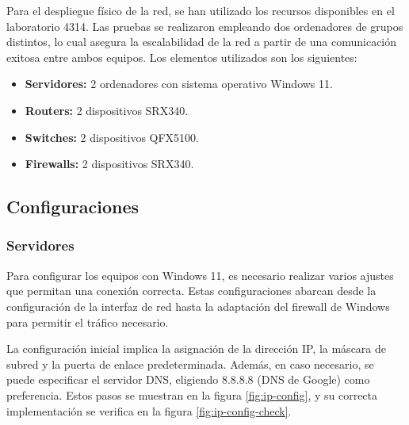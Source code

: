 \documentclass[%
    school=etsisi,%
    degree=61TI,%
]{upm-report}
\begin{document}
Para el despliegue físico de la red, se han utilizado los recursos disponibles en el laboratorio 4314. Las pruebas se realizaron empleando dos ordenadores de grupos distintos, lo cual asegura la escalabilidad de la red a partir de una comunicación exitosa entre ambos equipos. Los elementos utilizados son los siguientes:

\begin{itemize}
    \item \textbf{Servidores:} 2 ordenadores con sistema operativo Windows 11.
    \item \textbf{Routers:} 2 dispositivos SRX340.
    \item \textbf{Switches:} 2 dispositivos QFX5100.
    \item \textbf{Firewalls:} 2 dispositivos SRX340.
\end{itemize}

\subsection{Configuraciones}

\subsubsection{Servidores}

Para configurar los equipos con Windows 11, es necesario realizar varios ajustes que permitan una conexión correcta. Estas configuraciones abarcan desde la configuración de la interfaz de red hasta la adaptación del firewall de Windows para permitir el tráfico necesario.

La configuración inicial implica la asignación de la dirección IP, la máscara de subred y la puerta de enlace predeterminada. Además, en caso necesario, se puede especificar el servidor DNS, eligiendo 8.8.8.8 (DNS de Google) como preferencia. Estos pasos se muestran en la figura \ref{fig:ip-config}, y su correcta implementación se verifica en la figura \ref{fig:ip-config-check}.
\end{document}
